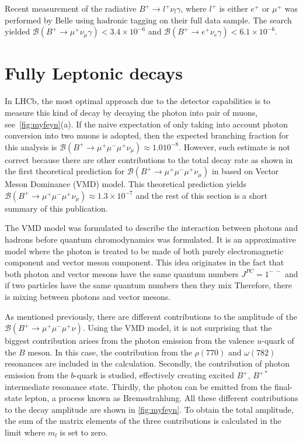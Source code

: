 Recent measurement of the radiative $B^{+} \rightarrow l^{+} \nu_{l} \gamma$, where $l^{+}$ is either $e^{+}$ or $\mu^{+}$ was performed by Belle using hadronic tagging on their full data sample\cite{Heller:2015vvm}. The search yielded $\mathcal{B}(B^{+}\rightarrow \mu^{+} \nu_\mu \gamma) < 3.4\times 10^{-6}$ and $\mathcal{B}(B^{+}\rightarrow e^{+} \nu_e \gamma) < 6.1\times 10^{-6}$.



\section{Fully Leptonic  decays}
\label{mydecay}

In LHCb, the most optimal approach due to the detector capabilities is to measure this kind of decay by decaying the photon into pair of muons, see~\autoref{fig:myfeyn}(a). If the naive expectation of only taking into account photon conversion into two muons is adopted, then the expected branching fraction for this analysis is $\mathcal{B}(B^{+}\rightarrow \mu^{+} \mu^{-} \mu^{+} \nu_{\mu}) \approx 1.0 10^{-8}$. However, such estimate is not correct because there are other contributions to the total decay rate as shown in the first theoretical prediction for $\mathcal{B}(B^{+}\rightarrow \mu^{+} \mu^{-} \mu^{+} \nu_{\mu})$ in \cite{Danilina:2018uzr} based on Vector Meson Dominance (VMD) model. This theoretical prediction yields $\mathcal{B}(B^{+} \rightarrow \mu^{+} \mu^{-} \mu^{+} \nu_{\mu}) \approx 1.3\times 10^{-7}$ and the rest of this section is a short summary of this publication.

 The VMD model was formulated to describe the interaction between photons and hadrons before quantum chromodynamics was formulated. It is an approximative model where the photon is treated to be made of both purely electromagnetic component and vector meson component. This idea originates in the fact that both photon and vector mesons have the same quantum numbers $J^{PC} = 1^{-\ -}$ and if two particles have the same quantum numbers then they mix %
 Therefore, there is mixing between photons and vector mesons.

As mentioned previously, there are different contributions to the amplitude of the $\mathcal{B}(B^{+}\rightarrow \mu^{+} \mu^{-} \mu^{+} \nu)$. Using the VMD model, it is not surprising that the biggest contribution arises from the photon emission from the valence $u$-quark of the $B$ meson. In this case, the contribution from the $\rho(770)$ and $\omega(782)$ resonances are included in the calculation. Secondly, the contribution of photon emission from the $b$-quark is studied, effectively creating excited $B^{+}$, $B^{+*}$ intermediate resonance state. Thirdly, the photon can be emitted from the final-state lepton, a process known as Bremsstrahlung. All these different contributions to the decay amplitude are shown in \autoref{fig:myfeyn}. To obtain the total amplitude, the sum of the matrix elements of the three contributions is calculated in the limit where $m_{l}$ is set to zero.



